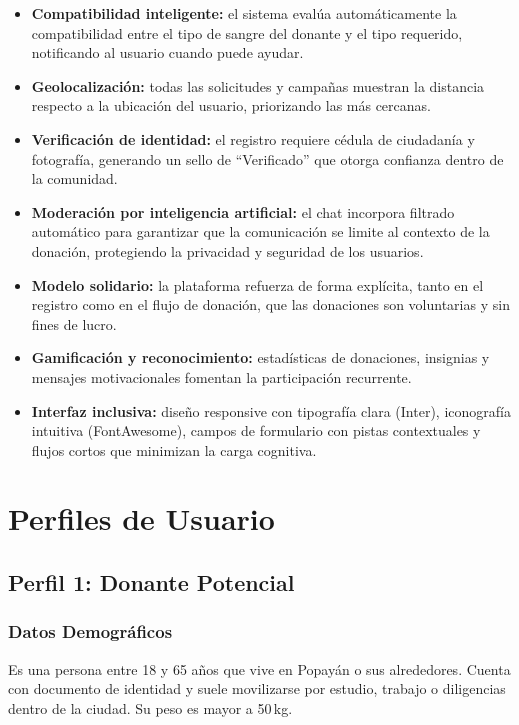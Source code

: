 \documentclass[12pt, a4paper]{article}
\begin{document}
\begin{itemize}
    \item \textbf{Compatibilidad inteligente:} el sistema evalúa automáticamente la compatibilidad entre el tipo de sangre del donante y el tipo requerido, notificando al usuario cuando puede ayudar.
    \item \textbf{Geolocalización:} todas las solicitudes y campañas muestran la distancia respecto a la ubicación del usuario, priorizando las más cercanas.
    \item \textbf{Verificación de identidad:} el registro requiere cédula de ciudadanía y fotografía, generando un sello de ``Verificado'' que otorga confianza dentro de la comunidad.
    \item \textbf{Moderación por inteligencia artificial:} el chat incorpora filtrado automático para garantizar que la comunicación se limite al contexto de la donación, protegiendo la privacidad y seguridad de los usuarios.
    \item \textbf{Modelo solidario:} la plataforma refuerza de forma explícita, tanto en el registro como en el flujo de donación, que las donaciones son voluntarias y sin fines de lucro.
    \item \textbf{Gamificación y reconocimiento:} estadísticas de donaciones, insignias y mensajes motivacionales fomentan la participación recurrente.
    \item \textbf{Interfaz inclusiva:} diseño responsive con tipografía clara (Inter), iconografía intuitiva (FontAwesome), campos de formulario con pistas contextuales y flujos cortos que minimizan la carga cognitiva.
\end{itemize}

\section{Perfiles de Usuario}

\subsection{Perfil 1: Donante Potencial}

\subsubsection{Datos Demográficos}
Es una persona entre 18 y 65 años que vive en Popayán o sus alrededores. Cuenta con documento de identidad y suele movilizarse por estudio, trabajo o diligencias dentro de la ciudad. Su peso es mayor a 50\,kg.
\end{document}
